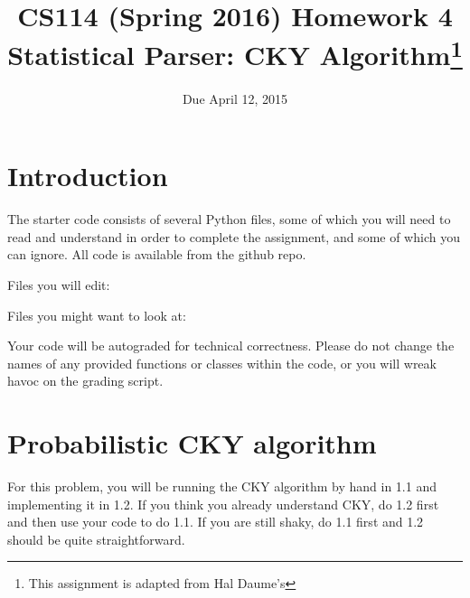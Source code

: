 \documentclass[11pt,letterpaper]{article}
\begin{document}
\title{CS114 (Spring 2016) Homework 4 \\ Statistical Parser: CKY Algorithm\footnote{This assignment is adapted from Hal Daume's}}
\author{Due April 12, 2015}
\date{}
\maketitle

\section*{Introduction}

The starter code consists of several Python files, some of which you will need to read and understand in order to complete the assignment, and some of which you can ignore. 
All code is available from the github repo.

Files you will edit:

Files you might want to look at:

Your code will be autograded for technical correctness. Please do not change the names of any provided functions or classes within the code, or you will wreak havoc on the grading script. 

\section{Probabilistic CKY algorithm}
For this problem, you will be  running the CKY algorithm by hand in 1.1 and implementing it in 1.2. If you think you already understand CKY, do 1.2 first and then use your code to do 1.1. 
If you are still shaky, do 1.1 first and 1.2 should be quite straightforward.
\end{document}
